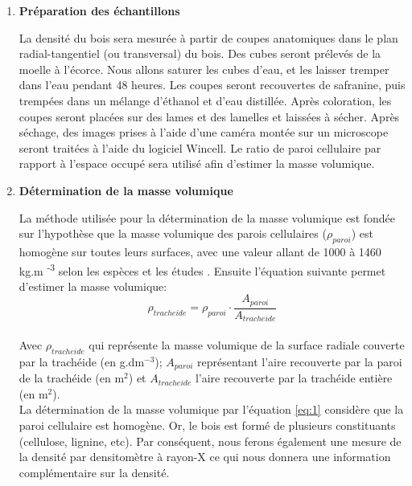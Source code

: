 \documentclass[a4paper,12pt]{report}
\begin{document}
\begin{enumerate}
	 

\item \textbf{Préparation des échantillons}

La densité du bois sera mesurée à partir de coupes anatomiques dans le plan radial-tangentiel (ou transversal) du bois. Des cubes seront prélevés de la moelle à l'écorce. Nous allons saturer les cubes d'eau, et les laisser tremper dans l'eau pendant 48 heures. Les coupes seront recouvertes de safranine, puis trempées dans un mélange d'éthanol et d'eau distillée. Après coloration, les coupes seront placées sur des lames et des lamelles et laissées à sécher. Après séchage, des images prises à l'aide d'une caméra montée sur un microscope seront traitées à l'aide du logiciel Wincell. Le ratio de paroi cellulaire par rapport à l'espace occupé sera utilisé afin d'estimer la masse volumique. \\

\item \textbf{Détermination de la masse volumique}

La méthode utilisée pour la détermination de la masse volumique est fondée sur l'hypothèse que la masse volumique des parois cellulaires ($\rho_{paroi}$) est homogène sur toutes leurs surfaces, avec une valeur allant de 1000 à 1460 kg.m \textsuperscript{-3} selon les espèces et les études \citep{Decoux2004}. Ensuite l'équation suivante permet d'estimer la masse volumique: \\

\begin{equation}\label{eq:1}
\rho_{tracheide} = \rho_{paroi}\cdot\frac{A_{paroi}}{A_{tracheide}}
\end{equation}\\

Avec $\rho_{tracheide}$ qui représente la masse volumique de la surface radiale couverte par la trachéide (en g.dm$^{-3}$); $A_{paroi}$ représentant l'aire recouverte par la paroi de la trachéide (en m$^{2}$) et $A_{tracheide}$ l'aire recouverte par la trachéide entière (en m$^{2}$).\\

La détermination de la masse volumique par l'équation \ref{eq:1} considère que la paroi cellulaire est homogène. Or, le bois est formé de plusieurs constituants (cellulose, lignine, etc). Par conséquent, nous ferons également une mesure de la densité par densitomètre à rayon-X ce qui nous donnera une information complémentaire sur la densité.
\end{enumerate}
\end{document}
